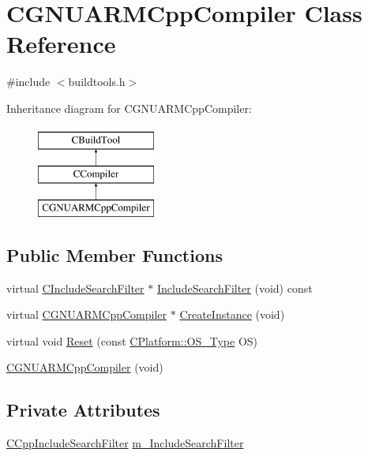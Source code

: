 \hypertarget{classCGNUARMCppCompiler}{\section{C\-G\-N\-U\-A\-R\-M\-Cpp\-Compiler Class Reference}
\label{classCGNUARMCppCompiler}
}


{\ttfamily \#include $<$buildtools.\-h$>$}

Inheritance diagram for C\-G\-N\-U\-A\-R\-M\-Cpp\-Compiler\-:\begin{figure}[H]
\begin{center}
\leavevmode
\includegraphics[height=3.000000cm]{d0/d77/classCGNUARMCppCompiler}
\end{center}
\end{figure}
\subsection*{Public Member Functions}
\begin{DoxyCompactItemize}
\item 
virtual \hyperlink{classCIncludeSearchFilter}{C\-Include\-Search\-Filter} $\ast$ \hyperlink{classCGNUARMCppCompiler_a061d65ad921d3856be6e2b8f80976106}{Include\-Search\-Filter} (void) const 
\item 
virtual \hyperlink{classCGNUARMCppCompiler}{C\-G\-N\-U\-A\-R\-M\-Cpp\-Compiler} $\ast$ \hyperlink{classCGNUARMCppCompiler_ae61a4db30f31a36bc46341da83ac9c63}{Create\-Instance} (void)
\item 
virtual void \hyperlink{classCGNUARMCppCompiler_aa51e81dcb2d4a6982aae3c8627e3fdc6}{Reset} (const \hyperlink{classCPlatform_a2fb735c63c53052f79629e338bb0f535}{C\-Platform\-::\-O\-S\-\_\-\-Type} O\-S)
\item 
\hyperlink{classCGNUARMCppCompiler_a7b41dd8037c30c9be8f0797c3180cb0f}{C\-G\-N\-U\-A\-R\-M\-Cpp\-Compiler} (void)
\end{DoxyCompactItemize}
\subsection*{Private Attributes}
\begin{DoxyCompactItemize}
\item 
\hyperlink{classCCppIncludeSearchFilter}{C\-Cpp\-Include\-Search\-Filter} \hyperlink{classCGNUARMCppCompiler_a18c1f490cdec9e19133ae5782554b073}{m\-\_\-\-Include\-Search\-Filter}
\end{DoxyCompactItemize}
